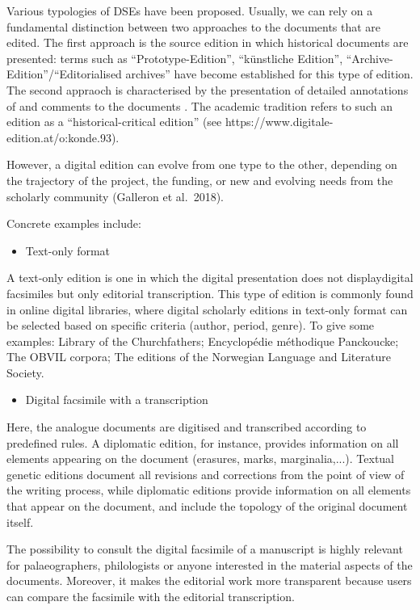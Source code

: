 \documentclass[
  letterpaper,
  DIV=11,
  numbers=noendperiod]{scrreprt}
\providecommand{\tightlist}{%
  \setlength{\itemsep}{0pt}\setlength{\parskip}{0pt}}\usepackage{longtable,booktabs,array}
\begin{document}
Various typologies of DSEs have been proposed. Usually, we can rely on a
fundamental distinction between two approaches to the documents that are
edited. The first approach is the source edition in which historical
documents are presented: terms such as ``Prototype-Edition'',
``künstliche Edition'', ``Archive-Edition''/``Editorialised archives''
have become established for this type of edition. The second appraoch is
characterised by the presentation of detailed annotations of and
comments to the documents . The academic tradition refers to such an
edition as a ``historical-critical edition'' (see
https://www.digitale-edition.at/o:konde.93).

However, a digital edition can evolve from one type to the other,
depending on the trajectory of the project, the funding, or new and
evolving needs from the scholarly community (Galleron et al.~2018).

Concrete examples include:

\begin{itemize}
\tightlist
\item
  Text-only format
\end{itemize}

A text-only edition is one in which the digital presentation does not
displaydigital facsimiles but only editorial transcription. This type of
edition is commonly found in online digital libraries, where digital
scholarly editions in text-only format can be selected based on specific
criteria (author, period, genre). To give some examples: Library of the
Churchfathers; Encyclopédie méthodique Panckoucke; The OBVIL corpora;
The editions of the Norwegian Language and Literature Society.

\begin{itemize}
\tightlist
\item
  Digital facsimile with a transcription
\end{itemize}

Here, the analogue documents are digitised and transcribed according to
predefined rules. A diplomatic edition, for instance, provides
information on all elements appearing on the document (erasures, marks,
marginalia,...). Textual genetic editions document all revisions and
corrections from the point of view of the writing process, while
diplomatic editions provide information on all elements that appear on
the document, and include the topology of the original document itself.

The possibility to consult the digital facsimile of a manuscript is
highly relevant for palaeographers, philologists or anyone interested in
the material aspects of the documents. Moreover, it makes the editorial
work more transparent because users can compare the facsimile with the
editorial transcription.
\end{document}
